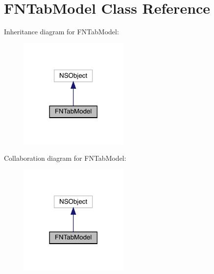 \hypertarget{interface_f_n_tab_model}{}\section{F\+N\+Tab\+Model Class Reference}
\label{interface_f_n_tab_model}


Inheritance diagram for F\+N\+Tab\+Model\+:\nopagebreak
\begin{figure}[H]
\begin{center}
\leavevmode
\includegraphics[width=153pt]{interface_f_n_tab_model__inherit__graph}
\end{center}
\end{figure}


Collaboration diagram for F\+N\+Tab\+Model\+:\nopagebreak
\begin{figure}[H]
\begin{center}
\leavevmode
\includegraphics[width=153pt]{interface_f_n_tab_model__coll__graph}
\end{center}
\end{figure}
